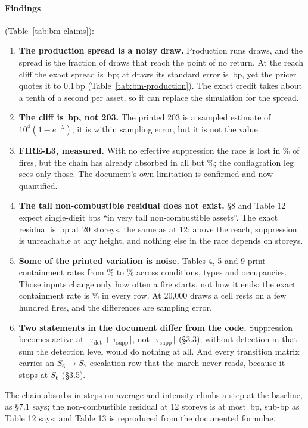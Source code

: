 \documentclass[11pt,a4paper]{article}
\begin{document}
\paragraph{Findings} (Table~\ref{tab:bm-claims}):
\begin{enumerate}[leftmargin=*]
\item \textbf{The production spread is a noisy draw.} Production runs \bmProductionN{}
  draws, and the spread is the fraction of draws that reach the point of no return.
  At the reach cliff the exact spread is \bmCliff\,bp; at \bmProductionN{} draws its
  standard error is \bmCliffSE\,bp, yet the pricer quotes it to 0.1\,bp
  (Table~\ref{tab:bm-production}). The exact credit takes about a tenth of a second
  per asset, so it can replace the simulation for the spread.
\item \textbf{The cliff is \bmCliff\,bp, not 203.} The printed 203 is a sampled estimate
  of $10^4(1-e^{-\lambda})$; it is within sampling error, but it is not the value.
\item \textbf{FIRE-L3, measured.} With no effective suppression the race is lost in
  \bmRaceLost\% of fires, but the chain has already absorbed in all but
  \bmRaceRecorded\%; the conflagration leg sees only those. The document's own
  limitation is confirmed and now quantified.
\item \textbf{The tall non-combustible residual does not exist.} \S8 and Table 12
  expect single-digit bps ``in very tall non-combustible assets''. The exact residual
  is \bmTall\,bp at 20 storeys, the same as at 12: above the reach, suppression is
  unreachable at any height, and nothing else in the race depends on storeys.
\item \textbf{Some of the printed variation is noise.} Tables 4, 5 and 9 print
  containment rates from \bmNoiseLow\% to \bmNoiseHigh\% across conditions, types and
  occupancies. Those inputs change only how often a fire starts, not how it ends: the
  exact containment rate is \bmNoiseExact\% in every row. At 20{,}000 draws a cell
  rests on a few hundred fires, and the differences are sampling error.
\item \textbf{Two statements in the document differ from the code.} Suppression
  becomes active at $\lceil\tau_{\mathrm{det}}+\tau_{\mathrm{supp}}\rceil$, not
  $\lceil\tau_{\mathrm{supp}}\rceil$ (\S3.3); without detection in that sum the
  detection level would do nothing at all. And every transition matrix carries an
  $S_6\to S_7$ escalation row that the march never reads, because it stops at $S_6$
  (\S3.5).
\end{enumerate}
The chain absorbs in \bmAbsorb{} steps on average and intensity climbs \bmGrowth{} a
step at the baseline, as \S7.1 says; the non-combustible residual at 12 storeys is at
most \bmResidual\,bp, sub-bp as Table 12 says; and Table 13 is reproduced from the
documented formulae.
\end{document}
